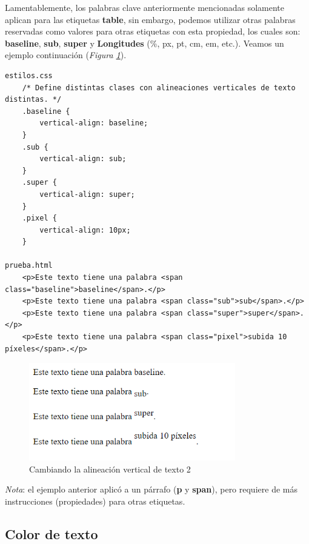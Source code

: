 Lamentablemente, los palabras clave anteriormente mencionadas solamente aplican para las etiquetas \textbf{table}, sin embargo, podemos utilizar otras palabras reservadas como valores para otras etiquetas con esta propiedad, los cuales son: \textbf{baseline}, \textbf{sub}, \textbf{super} y \textbf{Longitudes} (\%, px, pt, cm, em, etc.). Veamos un ejemplo continuación (\textit{Figura \ref{fig: 10}}).
\begin{lstlisting}
estilos.css
    /* Define distintas clases con alineaciones verticales de texto distintas. */
    .baseline {
        vertical-align: baseline;
    }
    .sub {
        vertical-align: sub;
    }
    .super {
        vertical-align: super;
    }
    .pixel {
        vertical-align: 10px;
    }

prueba.html
    <p>Este texto tiene una palabra <span class="baseline">baseline</span>.</p>
    <p>Este texto tiene una palabra <span class="sub">sub</span>.</p>
    <p>Este texto tiene una palabra <span class="super">super</span>.</p>
    <p>Este texto tiene una palabra <span class="pixel">subida 10 píxeles</span>.</p>
\end{lstlisting}
\begin{figure}[H]
    \centering
    \caption{Cambiando la alineación vertical de texto 2}
    \label{fig: 10}
    \includegraphics[width=9cm]{ss/fuentes-align-v2.png}
\end{figure}

\textit{Nota}: el ejemplo anterior aplicó a un párrafo (\textbf{p} y \textbf{span}), pero requiere de más instrucciones (propiedades) para otras etiquetas.


\subsection{Color de texto}

